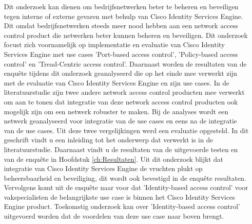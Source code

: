 Dit onderzoek kan dienen om bedrijfsnetwerken beter te beheren en beveiligen tegen interne of externe gevaren met behulp van Cisco Identity Services Engine. Dit omdat bedrijfsnetwerken steeds meer nood hebben aan een network access control product die netwerken beter kunnen beheren en beveiligen. Dit onderzoek focust zich voornamelijk op implementatie en evaluatie van Cisco Identity Services Engine met use cases 'Port-based access control', 'Policy-based access control' en 'Tread-Centric access control'. 
\newline
\newline
Daarnaast worden de resultaten van de enquête tijdens dit onderzoek geanalyseerd die op het einde mee verwerkt zijn met de evaluatie van Cisco Identity Services Engine en zijn use cases. In de literatuurstudie zijn twee andere network access control producten mee verwerkt om aan te tonen dat integratie van deze network access control producten ook mogelijk zijn om een netwerk robuster te maken. Bij de analyses wordt een netwerk geanalyseerd voor integratie van de use cases en eens na de integratie van de use cases. Uit deze twee vergelijkingen werd een evaluatie opgesteld. In dit geschrift vindt u een inleiding tot het onderwerp dat verwerkt is in de literatuurstudie. Daarnaast vindt u de resultaten van de uitgevoerde testen en van de enquête in Hoofdstuk \ref{ch:Resultaten}. 
\newline
\newline
Uit dit onderzoek blijkt dat integratie van Cisco Identity Services Engine de vruchten plukt op beheersbaarheid en beveiliging, dit wordt ook bevestigd in de enquête resultaten. Vervolgens komt uit de enquête naar voor dat 'Identity-based access control' voor vakspecialisten de belangrijkste use case is binnen het Cisco Identity Services Engine product. Toekomstig onderzoek kan over 'Identity-based access control' uitgevoerd worden dat de voordelen van deze use case naar boven brengt.
